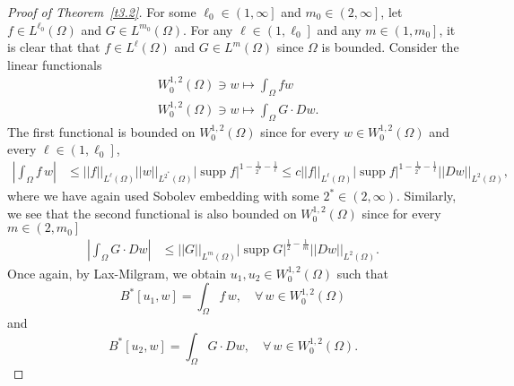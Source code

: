 \documentclass[12pt,reqno]{amsart}
\theoremstyle{plain}
\theoremstyle{definition}
\newenvironment{pf}
{\begin{proof}} {\end{proof}}
\DeclareMathOperator{\supp}{supp}
\newcommand{\Om}{\Omega}
\newcommand{\iny}{\infty}
\newcommand{\norm}[1]{\left\vert \left\vert #1\right\vert\right\vert}
\newcommand{\abs}[1]{\left\vert#1\right\vert}
\newcommand{\brac}[1]{\left[#1\right]}
\newcommand{\pr}[1]{\left( #1 \right) }
\newcommand{\pb}[1]{\left( #1 \right] }
\begin{document}
\begin{appendix}
\begin{pf}[Proof of Theorem~\ref{t3.2}]
For some $\ell_0 \in \pb{1, \iny}$ and $m_0 \in \pb{2, \iny}$, let $f \in L^{\ell_0}\pr{\Om}$ and $G \in L^{m_0}\pr{\Om}$.
For any $\ell \in \pb{1, \ell_0}$ and any $m \in \pb{1, m_0}$, it is clear that that $f \in L^\ell\pr{\Om}$ and $G \in L^m\pr{\Om}$ since $\Om$ is bounded. 
Consider the linear functionals
\begin{align*}
& W^{1,2}_0\pr{\Om} \ni w \mapsto \int_\Om f w \\
& W^{1,2}_0\pr{\Om} \ni w \mapsto \int_\Om G \cdot D w.
\end{align*}
The first functional is bounded on $W^{1,2}_0\pr{\Om}$ since for every $w \in W^{1,2}_0\pr{\Om}$ and every $\ell \in \pb{1, \ell_0}$,
\begin{align}
\abs{\int_{\Om} f \, w }
&\le \norm{f}_{L^{\ell}\pr{\Om}} \norm{w}_{L^{2^*}\pr{\Om}}\abs{\supp f}^{1 - \frac {1}{2^*} - \frac 1{\ell}} 
\le c \norm{f}_{L^{\ell}\pr{\Om}}\abs{\supp f}^{1 - \frac {1}{2^*} - \frac 1{\ell}} \norm{Dw}_{L^{2}\pr{\Om}},
\label{eqB.27}
\end{align}
where we have again used Sobolev embedding with some $2^* \in \pr{2, \iny}$.
Similarly, we see that the second functional is also bounded on $W^{1,2}_0\pr{\Om}$ since for every $m \in \pb{2, m_0}$
\begin{align}
\abs{\int_\Om G \cdot D w }
&\le \norm{G}_{L^{m}\pr{\Om}}\abs{\supp G}^{ \frac {1}{2} - \frac 1{m}}  \norm{Dw}_{L^{2}\pr{\Om}}.
\label{eqB.28}
\end{align}
Once again, by Lax-Milgram, we obtain $u_1, u_2 \in W^{1,2}_0\pr{\Om}$ such that
\begin{equation}
\label{eqB.29}
{B}^*\brac{u_1, w}=\int_\Om f \, w, \quad \forall \, w \in W^{1,2}_0\pr{\Om}
\end{equation}
and
\begin{equation}
\label{eqB.30}
{B}^*\brac{u_2, w}=\int_\Om G \cdot D w, \quad \forall \, w \in W^{1,2}_0\pr{\Om}.
\end{equation}


\end{pf}
\end{appendix}
\end{document}
